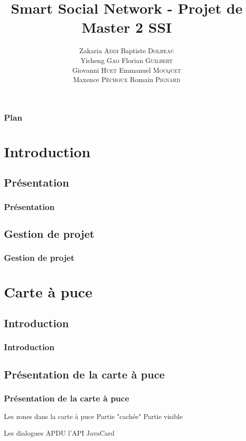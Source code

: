 \documentclass{beamer}
\title{Smart Social Network - Projet de Master 2 SSI}
\author{
    Zakaria \textsc{Addi}
    Baptiste \textsc{Dolbeau}\\
    Yicheng \textsc{Gao}
    Florian \textsc{Guilbert}\\
    Giovanni \textsc{Huet}
    Emmanuel \textsc{Mocquet}\\
    Maxence \textsc{Péchoux}
    Romain \textsc{Pignard}
}
\institute{Université de Rouen}
\begin{document}
\begin{frame}
\titlepage 
\end{frame}

\begin{frame}
\frametitle{Plan}
\tableofcontents[hideallsubsections]
\end{frame}

\section{Introduction}

\subsection{Présentation}
\begin{frame}
    \frametitle{Présentation}
    \begin{block}{ }
    \end{block}
\end{frame}

\subsection{Gestion de projet}
\begin{frame}
    \frametitle{Gestion de projet}
    \begin{block}{ }
    \end{block}
\end{frame}

\section{Carte à puce}

\subsection{Introduction}
\begin{frame}
    \frametitle{Introduction}
    \begin{block}{}
    \end{block}
\end{frame}

\subsection{Présentation de la carte à puce}
\begin{frame}
    \frametitle{Présentation de la carte à puce}
    \begin{block}{Les zones dans la carte à puce}
        Partie "cachée" 
        Partie visible
    \end{block}

    \pause

    \begin{block}{Les dialogues}
        APDU
        l'API JavaCard
            
    \end{block}
\end{frame}
\end{document}
